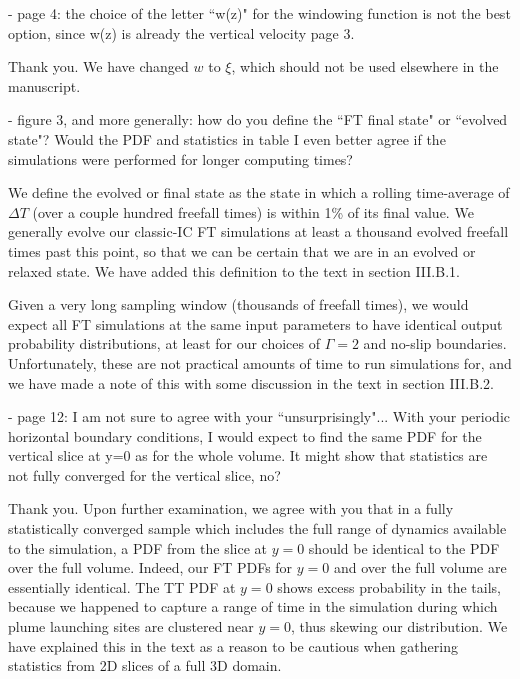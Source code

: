 \documentclass[aps, 11pt, singlecolumn]{revtex4-1} %
\begin{document}
\begin{singlespace}
\begin{myquotation}
- page 4: the choice of the letter ``w(z)" for the windowing function is not the best option, since w(z) is already the vertical velocity page 3.
\end{myquotation}
Thank you.
We have changed $w$ to $\xi$, which should not be used elsewhere in the manuscript.

\begin{myquotation}
- figure 3, and more generally: how do you define the ``FT final state" or ``evolved state"? 
Would the PDF and statistics in table I even better agree if the simulations were performed for longer computing times?
\end{myquotation}
We define the evolved or final state as the state in which a rolling time-average of $\Delta T$ (over a couple hundred freefall times) is within 1\% of its final value.
We generally evolve our classic-IC FT simulations at least a thousand evolved freefall times past this point, so that we can be certain that we are in an evolved or relaxed state.
We have added this definition to the text in section III.B.1.

Given a very long sampling window (thousands of freefall times), we would expect all FT simulations at the same input parameters to have identical output probability distributions, at least for our choices of $\Gamma = 2$ and no-slip boundaries.
Unfortunately, these are not practical amounts of time to run simulations for, and we have made a note of this with some discussion in the text in section III.B.2.

\begin{myquotation}
- page 12: I am not sure to agree with your ``unsurprisingly"... With your periodic horizontal boundary conditions, I would expect to find the same PDF for the vertical slice at y=0 as for the whole volume. 
It might show that statistics are not fully converged for the vertical slice, no?
\end{myquotation}
Thank you.
Upon further examination, we agree with you that in a fully statistically converged sample which includes the full range of dynamics available to the simulation, a PDF from the slice at $y = 0$ should be identical to the PDF over the full volume.
Indeed, our FT PDFs for $y = 0$ and over the full volume are essentially identical.
The TT PDF at $y = 0$ shows excess probability in the tails, because we happened to capture a range of time in the simulation during which plume launching sites are clustered near $y = 0$, thus skewing our distribution.
We have explained this in the text as a reason to be cautious when gathering statistics from 2D slices of a full 3D domain.


\end{singlespace}
\end{document}
